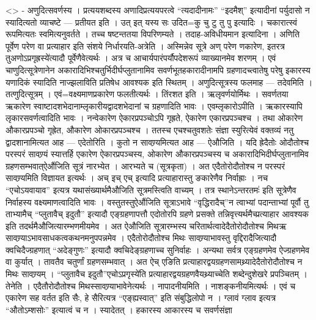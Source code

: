 \textless{}\textgreater{} - अणुदित्सवर्णस्य । प्रत्ययशब्दस्य
अणादिप्रत्ययपरत्वे ``त्यदादीनामः'' ``इदमैश्'' इत्यादीनां पर्युदासो न
स्यादित्यतो व्याचष्टे --- प्रतीयत इति । उत् इत् यस्य सः उदित=कु चु टु तु
पु इत्यादिः । चकारात्स्वं रूपमित्यतः स्वमित्यनुवर्तते । तच्च षष्टन्ततया
विपरिणम्यते । तदाह-अविधीयमान इत्यादिना । अणिति पूर्वेण परेण वा
प्रत्याहार इति संशये निर्धारयति-अत्रेति । अस्मिन्नेव सूत्रे अण् परेण
णकारेण, इतरत्र तुअणोऽप्रगृह्रस्ये॑त्यादौ पूर्वेणैवेत्यर्थः । अत्र च
आचार्यपारंपर्यौपदेशरूपं व्याख्यानमेव शरणम् । एवं चाणुदित्सूत्रेणानेन
अकारादिभिश्चतुर्भिदीर्घप्लुतानामिव सवर्णभूतहकारादीनामपि
ग्रहणादच्त्वातेषु परेषु इकारस्य यणादिकं स्यादिति नाज्झलाविति प्रतिषेध
आवश्यक इति स्थितम् । अणुदित्सूत्रस्य फलमाह --- तदेवमिति ।
तत्णुदित्सूत्रम् । एवं=वक्ष्यमाणप्रकारेण फलतीत्यर्थः । तिंरशत इति ।
ऋलृवर्णयोर्मिथः । सवर्णतया ऋकारेण स्वाष्टादशभेदानाम्लृकारीयद्वादशभेदानां
च ग्रहणादिति भावः । एवम्लृकारोऽपीति । ऋकारस्यापि लृकारसवर्णत्वादिति भावः
। नन्वेकारेण ऐकारप्रपञ्चोऽपि गृह्रते, ऐकारेण एकारप्रपञ्चश्च । तथा ओकारेण
औकारप्रपञ्चो गृह्रेत, औकारेण ओकारप्रपञ्चश्च । ततस्च एचश्चतुवशतेः संज्ञा
स्युरित्येवं वक्तव्यं नतु द्वादशानामित्यत आह --- एदेतोरिति । कुतो न
सावण्र्यमित्यत आह --- ऐऔजिति । यदि ह्रेदैतोः ओदौतोश्च परस्परं सावण्र्यं
स्यात्तर्हि एकारेण ऐकारप्रपञ्चस्य, ओकारेण औकारप्रपञ्चस्य च
अकारादिभिदीर्घप्लुतानामिव ग्रहणसम्भवात्ऐऔ॑जिति सूत्रं नारभ्येत । आरभ्यते
च (सूत्रकृता) । अत एदैतोरोदौतोश्च न परस्परं सावण्र्यमिति विज्ञायत
इत्यर्थः । अच् इच् एच् इत्यादि प्रत्याहारास्तु ङकारेणैव निर्वाह्राः । नच
``एचोऽयवायाव'' इत्यत्र यथासंख्यार्थमैऔजिति सूत्रमस्त्विति वाच्यम् । तत्र
स्थानेऽन्तरतमः॑ इति सूत्रेणैव निर्वाहस्य वक्ष्यमाणत्वादिति भावः ।
वस्तुतस्तुऐऔ॑जिति सूत्राऽभावे ``वृद्धिरादैच्''न त्वाभ्यां पदान्ताभ्यां
पूर्वौ तु ताभ्यामैच् ``प्लुतावैच् इदुतौ'' इत्यादौ एङ्ग्रहणापत्तौ
एदोतोरपि ग्रहणे प्रसक्ते तन्निवृत्त्यर्थमैच्प्रत्याहार आवश्यक इति
तदर्थमैऔजित्यारम्भणमीयमेव । अत ऐऔजिति सूत्रारम्भस्य
चरितार्थत्वादेदैतोरोदौतोश्च मिथऋ सावण्र्याऽभावसाधकत्वकथनमनुपपन्नमेव ।
एदैतोरोदौतोश्च मिथः सावण्र्याभावस्तु वृद्दिरादैजित्यादौ
क्वचिदैज्ग्रहणात् ``अदेङ्गुणः'' इत्यादौ क्वचिदेङ्ग्रहणाच्च सुनिर्वाहः ।
अन्यथा सर्वत्र एङ्ग्रहणमेव ऐज्ग्रहणमेव वा कुर्यात् । तावतैव चतुर्णां
ग्रहणसम्भवात् । अत ऐच् एङिति प्रत्याहारद्वयग्रहणसामथ्र्यादेदैतोरोदौतोश्च
न मिथः सावण्र्यम् । ``प्लुतावैच इदुतौ''एचोऽप्रगृस्ये॑ति
प्रत्याहारद्वयग्रहणवैयथ्र्याच्चेति शब्देन्दुशेखरे प्रपञ्चितम् । तेनेति ।
एदैतौरोदौतोश्च मिथस्सावण्र्याभावेनेत्यर्थः । नापादनीयमिति ।
नाशङ्कनीयमित्यर्थः । एवं च एकारेण सह वर्तत इति सैः, हे सैरित्यत्र
``एङ्ह्यस्वात्'' इति संबुद्धिलोपो न । ग्लावं ग्लाव इत्यत्र
``औतोऽम्शसोः'' इत्यात्वं च न । स्यादेतत् । हकारस्य आकारस्य च सवर्णसंज्ञा
